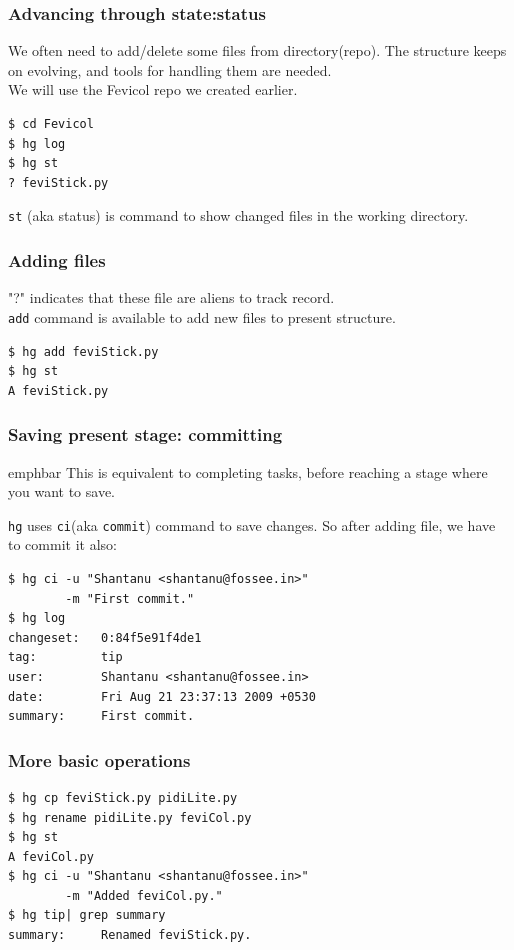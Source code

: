 \documentclass[14pt,compress]{beamer}
\newcommand{\emphbar}[1]
{\begin{beamercolorbox}[rounded=true]{emphbar} 
      {#1}
 \end{beamercolorbox}
}
\newcounter{time}
\newcommand{\inctime}[1]{\addtocounter{time}{#1}{\tiny \thetime\ m}}
\newcommand{\typ}[1]{\lstinline{#1}}
\begin{document}
\begin{frame}[fragile]
  \frametitle{Advancing through state:status}
  We often need to add/delete some files from directory(repo). The structure keeps on evolving, and tools for handling them are needed.\\
  We will use the Fevicol repo we created earlier.
  \begin{lstlisting}
$ cd Fevicol
$ hg log
$ hg st
? feviStick.py
  \end{lstlisting} %
  \typ{st} (aka status) is command to show changed files in the working directory.\\
\end{frame}

\begin{frame}[fragile]
  \frametitle{Adding files}
  "?" indicates that these file are aliens to track record.\\
  \typ{add} command is available to add new files to present structure.
  \begin{lstlisting}
$ hg add feviStick.py
$ hg st
A feviStick.py
  \end{lstlisting}
\end{frame}

\begin{frame}[fragile]
  \frametitle{Saving present stage: committing}
  \emphbar{This is equivalent to completing tasks, before reaching a stage where you want to save.}
  \typ{hg} uses \typ{ci}(aka \typ{commit}) command to save changes. So after adding file, we have to commit it also:
  \begin{lstlisting}
$ hg ci -u "Shantanu <shantanu@fossee.in>" 
        -m "First commit."
$ hg log
changeset:   0:84f5e91f4de1
tag:         tip
user:        Shantanu <shantanu@fossee.in>
date:        Fri Aug 21 23:37:13 2009 +0530
summary:     First commit.    
  \end{lstlisting}
\end{frame}

\begin{frame}[fragile]
  \frametitle{More basic operations}
  \begin{lstlisting}
$ hg cp feviStick.py pidiLite.py
$ hg rename pidiLite.py feviCol.py
$ hg st
A feviCol.py
$ hg ci -u "Shantanu <shantanu@fossee.in>" 
        -m "Added feviCol.py."
$ hg tip| grep summary 
summary:     Renamed feviStick.py.
  \end{lstlisting} %
  \inctime{10}
\end{frame}
\end{document}
